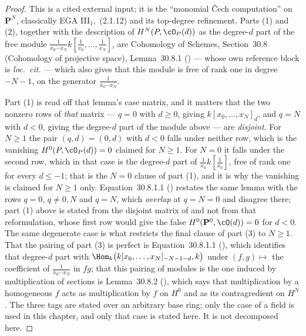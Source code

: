 \begin{proof}
This is a cited external input; it is the ``monomial Čech
computation'' on $\mathbf P^N$, classically EGA III$_1$, \,(2.1.12) and
its top-degree refinement.  Parts (1) and (2), together with the
description of $H^N(P,\cO_P(d))$ as the degree-$d$ part of the free
module $\frac{1}{x_0\cdots x_N}k[\frac1{x_0},\dots,\frac1{x_N}]$, are
Cohomology of Schemes, Section~30.8 (Cohomology of projective space),
Lemma~30.8.1 () --- whose own reference block is
\emph{loc.\ cit.} --- which also gives that this module is free of rank
one in degree $-N-1$, on the generator $\frac{1}{x_0\cdots x_N}$.

Part (1) is read off that lemma's case matrix, and it matters that the
two nonzero rows of \emph{that} matrix --- $q=0$ with $d\ge0$, giving
$k[x_0,\dots,x_N]_d$, and $q=N$ with $d<0$, giving the degree-$d$ part
of the module above --- are \emph{disjoint}.  For $N\ge1$ the pair
$(q,d)=(0,d)$ with $d<0$ falls under neither row, which is the
vanishing $H^0(P,\cO_P(d))=0$ claimed for $N\ge1$.  For $N=0$ it
falls under the second row, which in that case is the degree-$d$ part
of $\frac{1}{x_0}k[\frac1{x_0}]$, free of rank one for every
$d\le-1$; that is the $N=0$ clause of part (1), and it is why the
vanishing is claimed for $N\ge1$ only.  Equation~30.8.1.1
() restates the same lemma with the rows $q=0$,
$q\ne0,N$ and $q=N$, which \emph{overlap} at $q=N=0$ and disagree
there; part (1) above is stated from the disjoint matrix of
 and not from that reformulation, whose first row
would give the false $H^0(\mathbf P^0,\cO(d))=0$ for $d<0$.  The same
degenerate case is what restricts the final clause of part (3) to
$N\ge1$.  That
the pairing of part (3) is perfect is Equation~30.8.1.1
(), which identifies that degree-$d$ part with
$\Hom_k\bigl(k[x_0,\dots,x_N]_{-N-1-d},k\bigr)$ under
$(f,g)\mapsto$ the coefficient of $\frac{1}{x_0\cdots x_N}$ in $fg$;
that this pairing of modules is the one induced by multiplication of
sections is Lemma~30.8.2 (), which says that
multiplication by a homogeneous $f$ acts as multiplication by $f$ on
$H^0$ and as its contragredient on $H^N$.  The three tags are stated
over an arbitrary base ring; only the case of a field is used in this
chapter, and only that case is stated here.  It is not decomposed here.
\end{proof}

